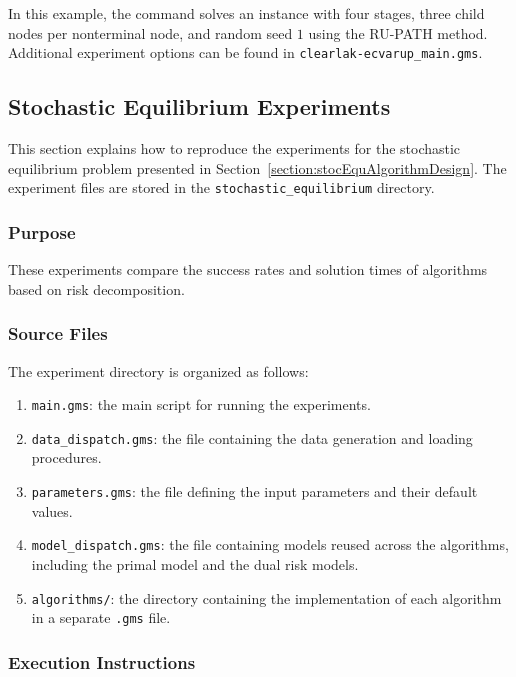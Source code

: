 In this example, the command solves an instance with four stages, three child nodes per nonterminal node, and random seed $1$ using the RU-PATH method. Additional experiment options can be found in \texttt{clearlak-ecvarup\_main.gms}.

\subsection{Stochastic Equilibrium Experiments}

This section explains how to reproduce the experiments for the stochastic equilibrium problem presented in Section~\ref{section:stocEquAlgorithmDesign}. The experiment files are stored in the \texttt{stochastic\_equilibrium} directory.

\subsubsection{Purpose}

These experiments compare the success rates and solution times of algorithms based on risk decomposition.

\subsubsection{Source Files}

The experiment directory is organized as follows:
\begin{enumerate}
    \item \texttt{main.gms}: the main script for running the experiments.
    \item \texttt{data\_dispatch.gms}: the file containing the data generation and loading procedures.
    \item \texttt{parameters.gms}: the file defining the input parameters and their default values.
    \item \texttt{model\_dispatch.gms}: the file containing models reused across the algorithms, including the primal model and the dual risk models.
    \item \texttt{algorithms/}: the directory containing the implementation of each algorithm in a separate \texttt{.gms} file.
\end{enumerate}

\subsubsection{Execution Instructions}

